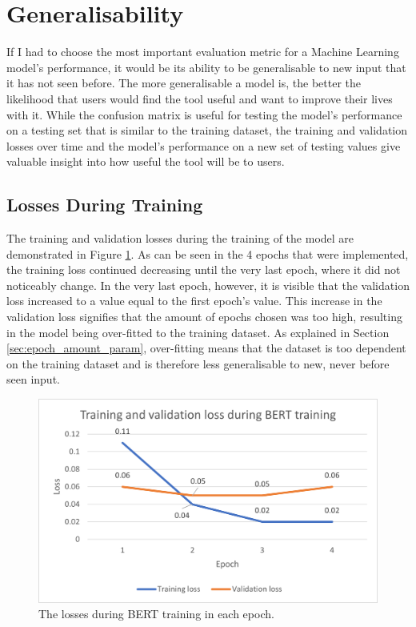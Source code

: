 \documentclass{l4proj}
\begin{document}
\section{Generalisability}

If I had to choose the most important evaluation metric for a Machine Learning model's performance, it would be its ability to be generalisable to new input that it has not seen before. The more generalisable a model is, the better the likelihood that users would find the tool useful and want to improve their lives with it. While the confusion matrix is useful for testing the model's performance on a testing set that is similar to the training dataset, the training and validation losses over time and the model's performance on a new set of testing values give valuable insight into how useful the tool will be to users.

\subsection{Losses During Training}

The training and validation losses during the training of the model are demonstrated in Figure \ref{fig:eval_losses}. As can be seen in the 4 epochs that were implemented, the training loss continued decreasing until the very last epoch, where it did not noticeably change. In the very last epoch, however, it is visible that the validation loss increased to a value equal to the first epoch's value. This increase in the validation loss signifies that the amount of epochs chosen was too high, resulting in the model being over-fitted to the training dataset. As explained in Section \ref{sec:epoch_amount_param}, over-fitting means that the dataset is too dependent on the training dataset and is therefore less generalisable to new, never before seen input. 

\begin{figure}
    \centering
    \includegraphics[width=0.8\linewidth]{images/Evaluation/trainingLosses.png}    

    \caption{The losses during BERT training in each epoch.}
    \label{fig:eval_losses} 
\end{figure}
\end{document}
